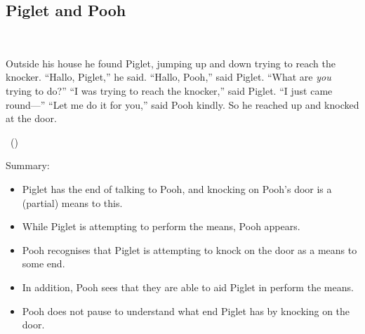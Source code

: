 \documentclass[10pt]{article}
\newcommand{\hozlinedash}[0]{%
  \noindent\hdashrule[0.5ex][c]{\textwidth}{.1pt}{2.5pt}
}
\begin{document}
\subsection{Piglet and Pooh}
\label{sec:piglet-pooh}


\begin{scenario}\mbox{ }

  \noindent Outside his house he found Piglet, jumping up and down trying to reach the knocker.\newline
  ``Hallo, Piglet,'' he said.\newline
  ``Hallo, Pooh,'' said Piglet.\newline
  ``What are \emph{you} trying to do?''\newline
  ``I was trying to reach the knocker,'' said Piglet.
  ``I just came round---''\newline
  ``Let me do it for you,'' said Pooh kindly.
  So he reached up and knocked at the door.

  \mbox{ }\hfill\mbox{(\cite[77--78]{Milne:2009aa})}
\end{scenario}

\begin{center}
\end{center}

\hozlinedash

Summary:
\begin{itemize}[noitemsep]
\item Piglet has the end of talking to Pooh, and knocking on Pooh's door is a (partial) means to this.
\item While Piglet is attempting to perform the means, Pooh appears.
\item Pooh recognises that Piglet is attempting to knock on the door as a means to some end.
\item In addition, Pooh sees that they are able to aid Piglet in perform the means.
\item Pooh does not pause to understand what end Piglet has by knocking on the door.
\end{itemize}
\end{document}
